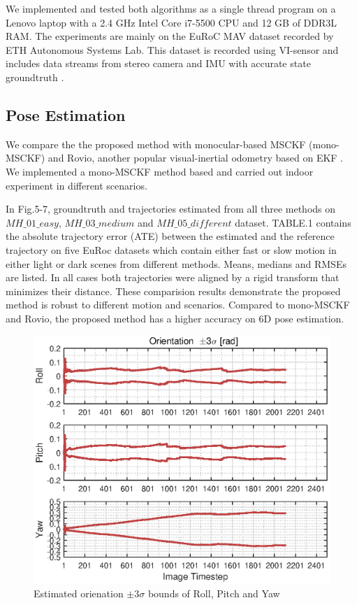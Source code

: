 \documentclass[a4paper, 10pt, conference]{ieeeconf}      %
\begin{document}
We implemented and tested both algorithms as a single thread program on a Lenovo laptop with a 2.4 GHz
Intel Core i7-5500 CPU and 12 GB of DDR3L RAM. The experiments are mainly  on the  EuRoC MAV dataset recorded by ETH Autonomous Systems Lab. This dataset is recorded using VI-sensor and includes data streams from stereo camera and IMU with  accurate state groundtruth \cite{Burri25012016}. 




\subsection{Pose Estimation} 

We compare the the proposed method with  monocular-based MSCKF (mono-MSCKF) and Rovio, another popular visual-inertial odometry based on EKF \cite{bloesch2015robust}. We implemented a mono-MSCKF method based \cite{mourikis2007multi} and carried out indoor experiment in different scenarios. 

In Fig.5-7, groundtruth and  trajectories estimated from all three methods on $MH\_01\_easy$, $MH\_03\_medium$  and $MH\_05\_different$ dataset. TABLE.1 contains the
absolute trajectory error (ATE) between the estimated and
the reference trajectory  on five EuRoc datasets which contain either fast or slow motion in either light or dark scenes from different methods. Means, medians and RMSEs are listed. In all cases both trajectories were aligned by a rigid transform that minimizes their distance.  These comparision results demonstrate the proposed method is robust to different motion and scenarios. Compared to mono-MSCKF and Rovio, the proposed method has a higher  accuracy on 6D pose estimation.

 \begin{figure}[thpb]
 	\centering
 	
 	\includegraphics[scale=0.6]{orienation_3sigma.eps}
 	
 	\caption{Estimated orienation $ \pm 3 \sigma $ bounds of Roll, Pitch and Yaw  }
 	\label{figurelabel}
 \end{figure}
\end{document}
